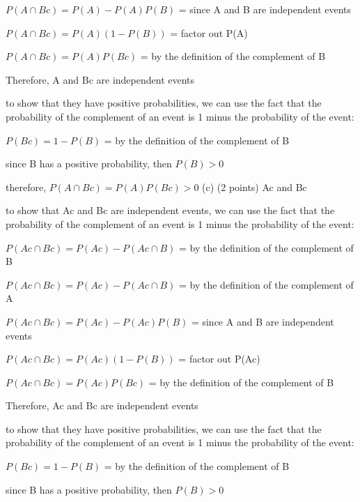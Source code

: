 \documentclass{article}
\begin{document}
\(P(A \cap Bc) = P(A) - P(A)P(B)\) = since A and B are independent events

\(P(A \cap Bc) = P(A)(1 - P(B))\) = factor out P(A)

\(P(A \cap Bc) = P(A)P(Bc)\) = by the definition of the complement of B

Therefore, A and Bc are independent events\newline

to show that they have positive probabilities, we can use the fact that the probability of the complement of an event is 1 minus the probability of the event:

\(P(Bc) = 1 - P(B)\) = by the definition of the complement of B

since B has a positive probability, then \(P(B) > 0\)

therefore, \(P(A \cap Bc) = P(A)P(Bc) > 0\)   \newline
(c) (2 points) Ac and Bc\newline

to show that Ac and Bc are independent events, we can use the fact that the probability of the complement of an event is 1 minus the probability of the event:

\(P(Ac \cap Bc) = P(Ac) - P(Ac \cap B)\) = by the definition of the complement of B

\(P(Ac \cap Bc) = P(Ac) - P(Ac \cap B)\) = by the definition of the complement of A

\(P(Ac \cap Bc) = P(Ac) - P(Ac)P(B)\) = since A and B are independent events

\(P(Ac \cap Bc) = P(Ac)(1 - P(B))\) = factor out P(Ac)

\(P(Ac \cap Bc) = P(Ac)P(Bc)\) = by the definition of the complement of B

Therefore, Ac and Bc are independent events\newline\newline

to show that they have positive probabilities, we can use the fact that the probability of the complement of an event is 1 minus the probability of the event:

\(P(Bc) = 1 - P(B)\) = by the definition of the complement of B

since B has a positive probability, then \(P(B) > 0\)
\end{document}
